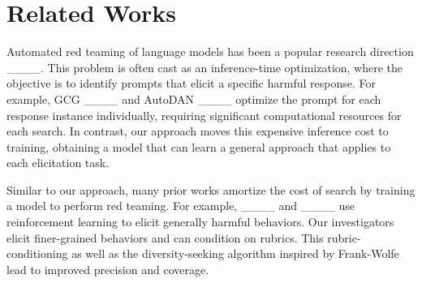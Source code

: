 \section{Related Works}
Automated red teaming of language models has been a popular research direction ____. This problem is often cast as an inference-time optimization, where the objective is to identify prompts that elicit a specific harmful response. For example, GCG ____ and AutoDAN ____ optimize the prompt for each response instance individually, requiring significant computational resources for each search. In contrast, our approach moves this expensive inference cost to training, obtaining a model that can learn a general approach that applies to each elicitation task.

Similar to our approach, many prior works amortize the cost of search by training a model to perform red teaming. For example, ____ and ____ use reinforcement learning to elicit generally harmful behaviors. Our investigators elicit finer-grained behaviors and can condition on rubrics. This rubric-conditioning as well as the diversity-seeking algorithm inspired by Frank-Wolfe lead to improved precision and coverage.